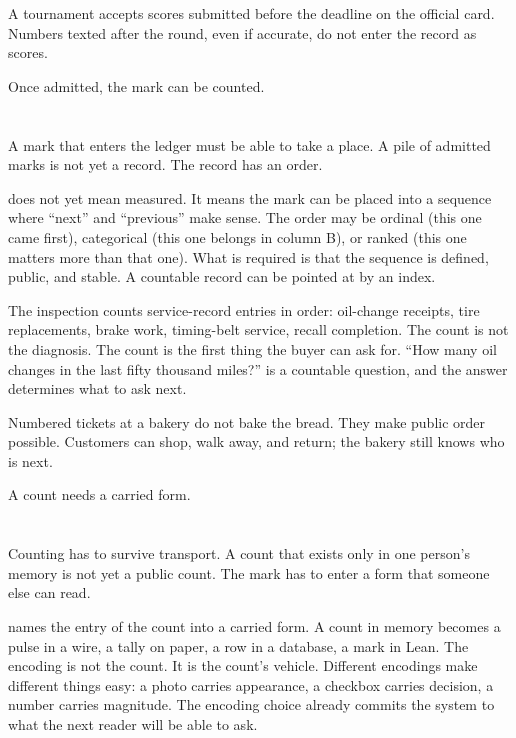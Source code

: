 A tournament accepts scores submitted before the deadline on the official
card. Numbers texted after the round, even if accurate, do not enter the
record as scores.

Once admitted, the mark can be counted.

\section{}
\label{se:countable}

A mark that enters the ledger must be able to take a place. A pile of
admitted marks is not yet a record. The record has an order.

 does not yet mean measured. It means the mark can be placed
into a sequence where ``next'' and ``previous'' make sense. The order may be
ordinal (this one came first), categorical (this one belongs in column B),
or ranked (this one matters more than that one). What is required is that
the sequence is defined, public, and stable. A countable record can be
pointed at by an index.

The inspection counts service-record entries in order: oil-change receipts,
tire replacements, brake work, timing-belt service, recall completion. The
count is not the diagnosis. The count is the first thing the buyer can ask
for. ``How many oil changes in the last fifty thousand miles?'' is a
countable question, and the answer determines what to ask next.

Numbered tickets at a bakery do not bake the bread. They make public order
possible. Customers can shop, walk away, and return; the bakery still knows
who is next.

A count needs a carried form.

\section{}
\label{se:encoded}

Counting has to survive transport. A count that exists only in one person's
memory is not yet a public count. The mark has to enter a form that someone
else can read.

 names the entry of the count into a carried form. A count in
memory becomes a pulse in a wire, a tally on paper, a row in a database, a
mark in Lean. The encoding is not the count. It is the count's vehicle.
Different encodings make different things easy: a photo carries appearance,
a checkbox carries decision, a number carries magnitude. The encoding choice
already commits the system to what the next reader will be able to ask.


